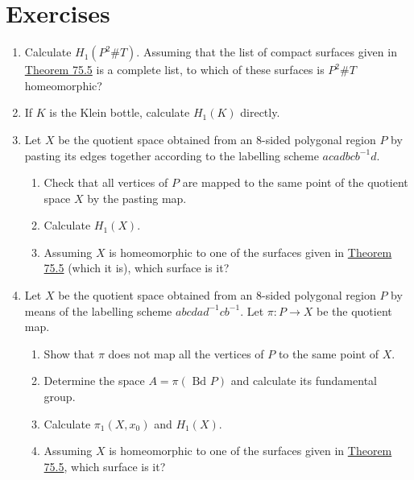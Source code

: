 \section*{Exercises}
\begin{enumerate}[itemsep=0.4em, parsep=0pt, topsep=0pt, partopsep=0pt, leftmargin=*, label=\arabic*., ref=\arabic*]
\item Calculate \(H_{1}( {P^{2}\# T})\). Assuming that the list of compact surfaces given in \hyperref[thm:75.5]{Theorem 75.5} is a complete list, to which of these surfaces is \(P^{2}\# T\) homeomorphic?
\item If \(K\) is the Klein bottle, calculate \(H_{1}( K)\) directly.
\item Let \(X\) be the quotient space obtained from an 8-sided polygonal region \(P\) by pasting its edges together according to the labelling scheme \(acadbcb^{-1}d\).
 \begin{enumerate}[itemsep=0.2em, parsep=0pt, topsep=0pt, partopsep=0pt, leftmargin=*, label=(\alph*), align=left]
 \item Check that all vertices of \(P\) are mapped to the same point of the quotient space \(X\) by the pasting map.
 \item Calculate \(H_{1}( X)\).
 \item Assuming \(X\) is homeomorphic to one of the surfaces given in \hyperref[thm:75.5]{Theorem 75.5} (which it is), which surface is it?
 \end{enumerate}
\item[*4.] Let \(X\) be the quotient space obtained from an 8-sided polygonal region \(P\) by means of the labelling scheme \({abcda}d^{-1}cb^{-1}\). Let \(\pi : P \rightarrow X\) be the quotient map.
 \begin{enumerate}[itemsep=0.2em, parsep=0pt, topsep=0pt, partopsep=0pt, leftmargin=*, label=(\alph*), align=left]
 \item Show that \(\pi\) does not map all the vertices of \(P\) to the same point of \(X\).
 \item Determine the space \(A = \pi ( {\text{ Bd }P})\) and calculate its fundamental group.
 \item Calculate \({\pi }_{1}( {X,x_{0}})\) and \(H_{1}( X)\).
 \item Assuming \(X\) is homeomorphic to one of the surfaces given in \hyperref[thm:75.5]{Theorem 75.5}, which surface is it?
 \end{enumerate}
\end{enumerate}

